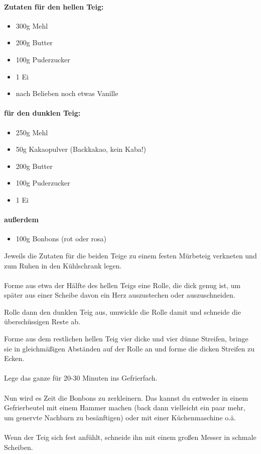 {\paragraph{Zutaten für den hellen Teig:}
\begin{itemize}
    \item 300g Mehl
    \item 200g Butter
    \item 100g Puderzucker
    \item 1 Ei
    \item nach Belieben noch etwas Vanille
\end{itemize}
\paragraph{für den dunklen Teig:}
\begin{itemize}
    \item 250g Mehl
    \item 50g Kakaopulver (Backkakao, kein Kaba!)
    \item 200g Butter
    \item 100g Puderzucker
    \item 1 Ei
\end{itemize}
\paragraph{außerdem}
\begin{itemize}
    \item 100g Bonbons (rot oder rosa)
\end{itemize}
\vspace*{\fill}
\columnbreak
Jeweils die Zutaten für die beiden Teige zu einem festen Mürbeteig verkneten
und zum Ruhen in den Kühlschrank legen.
\\~\\
Forme aus etwa der Hälfte des hellen Teigs eine Rolle, die dick genug ist, um
später aus einer Scheibe davon ein Herz auszustechen oder auszuschneiden.

Rolle dann den dunklen Teig aus, umwickle die Rolle damit und schneide die
überschüssigen Reste ab. 

Forme aus dem restlichen hellen Teig vier dicke und
vier dünne Streifen, bringe sie in gleichmäßigen Abständen auf der Rolle an und
forme die dicken Streifen zu Ecken.
\\~\\
Lege das ganze für 20-30 Minuten ins Gefrierfach.
\\~\\
Nun wird es Zeit die Bonbons zu zerkleinern. Das kannst du entweder in einem
Gefrierbeutel mit einem Hammer machen (back dann vielleicht ein paar mehr, um
genervte Nachbarn zu besänftigen) oder mit einer Küchenmaschine o.ä.
\\~\\
Wenn der Teig sich fest anfühlt, schneide ihn mit einem großen Messer in
schmale Scheiben. 

}

